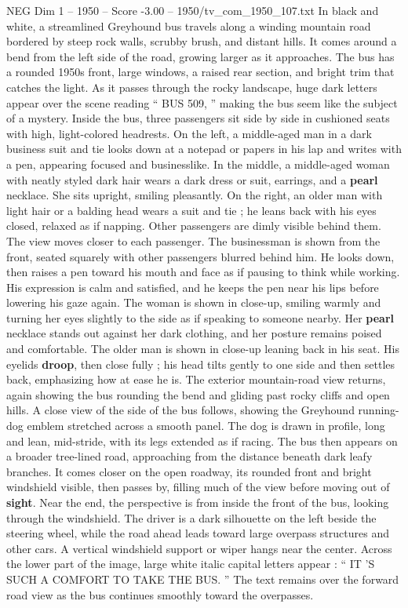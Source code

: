 \begin{textsample}{NEG Dim 1 – 1950 – Score -3.00 – 1950/tv\_com\_1950\_107.txt}  \label{ex:f1_neg_008}
In black and white, a streamlined Greyhound bus travels along a winding mountain road bordered by steep rock walls, scrubby brush, and distant hills.
It comes around a bend from the left side of the road, growing larger as it approaches.
The bus has a rounded 1950s front, large windows, a raised rear section, and bright trim that catches the light.
As it passes through the rocky landscape, huge dark letters appear over the scene reading “ BUS 509, ” making the bus seem like the subject of a mystery.
Inside the bus, three passengers sit side by side in cushioned seats with high, light-colored headrests.
On the left, a middle-aged man in a dark business suit and tie looks down at a notepad or papers in his lap and writes with a pen, appearing focused and businesslike.
In the middle, a middle-aged woman with neatly styled dark hair wears a dark dress or suit, earrings, and a \textbf{pearl} necklace.
She sits upright, smiling pleasantly.
On the right, an older man with light hair or a balding head wears a suit and tie ; he leans back with his eyes closed, relaxed as if napping.
Other passengers are dimly visible behind them.
The view moves closer to each passenger.
The businessman is shown from the front, seated squarely with other passengers blurred behind him.
He looks down, then raises a pen toward his mouth and face as if pausing to think while working.
His expression is calm and satisfied, and he keeps the pen near his lips before lowering his gaze again.
The woman is shown in close-up, smiling warmly and turning her eyes slightly to the side as if speaking to someone nearby.
Her \textbf{pearl} necklace stands out against her dark clothing, and her posture remains poised and comfortable.
The older man is shown in close-up leaning back in his seat.
His eyelids \textbf{droop}, then close fully ; his head tilts gently to one side and then settles back, emphasizing how at ease he is.
The exterior mountain-road view returns, again showing the bus rounding the bend and gliding past rocky cliffs and open hills.
A close view of the side of the bus follows, showing the Greyhound running-dog emblem stretched across a smooth panel.
The dog is drawn in profile, long and lean, mid-stride, with its legs extended as if racing.
The bus then appears on a broader tree-lined road, approaching from the distance beneath dark leafy branches.
It comes closer on the open roadway, its rounded front and bright windshield visible, then passes by, filling much of the view before moving out of \textbf{sight}.
Near the end, the perspective is from inside the front of the bus, looking through the windshield.
The driver is a dark silhouette on the left beside the steering wheel, while the road ahead leads toward large overpass structures and other cars.
A vertical windshield support or wiper hangs near the center.
Across the lower part of the image, large white italic capital letters appear : “ IT ’S SUCH A COMFORT TO TAKE THE BUS. ” The text remains over the forward road view as the bus continues smoothly toward the overpasses.

\end{textsample}
